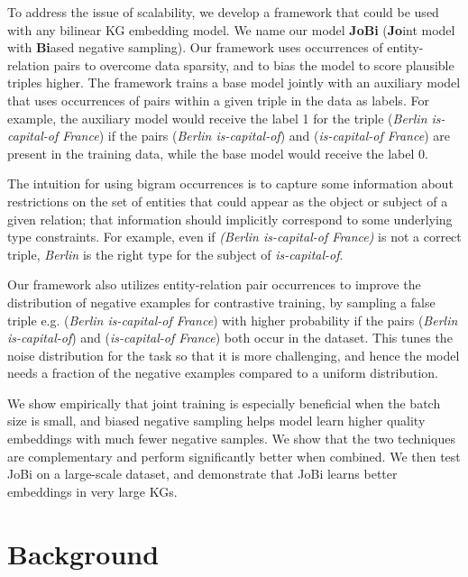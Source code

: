 \documentclass[11pt,a4paper, dvipsnames]{article}
\begin{document}
To address the issue of scalability, we develop a framework that could be used with any bilinear KG embedding model.  We name our model \textbf{JoBi} (\textbf{Jo}int model with \textbf{Bi}ased negative sampling). Our framework uses occurrences of entity-relation pairs to overcome data sparsity, and to bias the model to score plausible triples higher. The framework trains a base model jointly with an auxiliary model that uses occurrences of pairs within a given triple in the data as labels. For example, the auxiliary model would receive the label 1 for the triple (\textit{Berlin is-capital-of France}) if the pairs (\textit{Berlin is-capital-of}) and (\textit{is-capital-of France}) are present in the training data, while the base model would receive the label 0. 

The intuition for using bigram occurrences is to capture some information about restrictions on the set of entities that could appear as the object or subject of a given relation; that information should implicitly correspond to some underlying type constraints. For example, even if \textit{(Berlin is-capital-of France)} is not a correct triple, \textit{Berlin} is the right type for the subject of \textit{is-capital-of}.

Our framework also utilizes entity-relation pair occurrences to improve the distribution of negative examples for contrastive training, by sampling a false triple e.g. (\textit{Berlin is-capital-of France}) with higher probability if the pairs (\textit{Berlin is-capital-of}) and (\textit{is-capital-of France}) both occur in the dataset. This tunes the noise distribution for the task so that it is more challenging, and hence the model needs a fraction of the negative examples compared to a uniform distribution.    

We show empirically that joint training is especially beneficial when the batch size is small, and biased negative sampling helps model learn higher quality embeddings with much fewer negative samples. We show that the two techniques are complementary and perform significantly better when combined. We then test JoBi on a large-scale dataset, and demonstrate that JoBi learns better embeddings in very large KGs. 





\section{Background}
\end{document}
